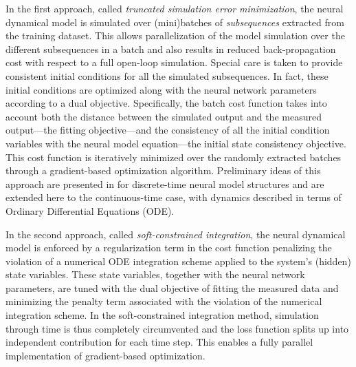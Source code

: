 \documentclass{article} %
\begin{document}
In the first approach, called  \emph{truncated simulation error minimization}, the neural dynamical model is simulated over (mini)batches of 
\emph{subsequences} extracted from the training dataset. This allows parallelization of the model simulation over the different subsequences in a batch and also results in reduced back-propagation cost with respect to a full open-loop simulation. 
Special care is taken to provide consistent initial conditions for all the simulated subsequences. In fact, these initial conditions are optimized along with the neural network parameters according to a dual objective. Specifically, the batch cost function takes into account both the distance between the simulated output and the measured output---the fitting objective---and the consistency of all the initial condition variables with the neural model equation---the initial state consistency objective. This cost function is iteratively minimized over the randomly extracted batches through a gradient-based optimization algorithm.
Preliminary ideas of this approach are presented  in \cite{forgione20Uz} for discrete-time 
neural model structures and are extended here to the continuous-time case, with dynamics described in terms of Ordinary Differential Equations (ODE).


In the second approach, called \emph{soft-constrained integration},   
the neural dynamical model is enforced by a regularization term in the cost function penalizing the violation of a numerical ODE integration scheme applied to the system's (hidden) state variables.
These state variables, together with the neural network parameters, are tuned with the dual objective of fitting the measured data and minimizing the penalty term associated with the violation of the numerical integration scheme.
In the soft-constrained integration method, simulation through time is thus completely circumvented and the loss function splits up into independent contribution for each time step. This enables a fully parallel implementation of gradient-based optimization.
\end{document}
